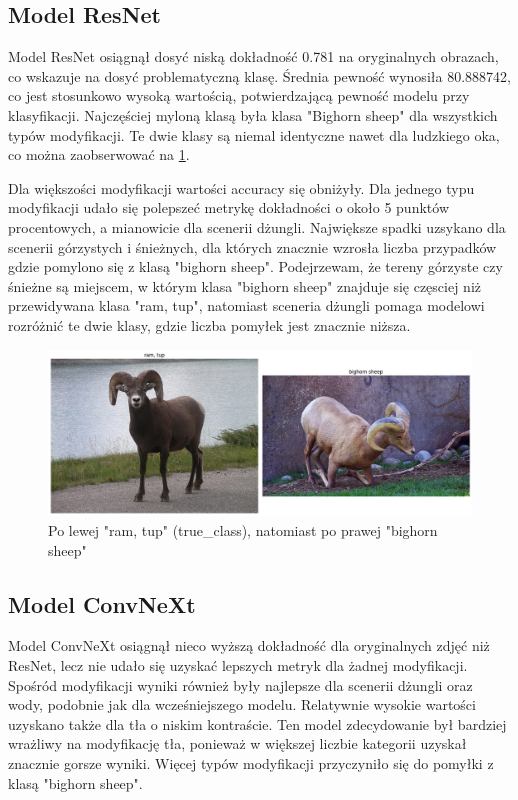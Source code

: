 \subsection*{Model ResNet}

Model ResNet osiągnął dosyć niską dokładność 0.781 na oryginalnych obrazach, co wskazuje na dosyć problematyczną klasę. Średnia pewność wynosiła 80.888742, co jest stosunkowo wysoką wartością, potwierdzającą pewność modelu przy klasyfikacji. Najczęściej myloną klasą była klasa 
"Bighorn sheep" dla wszystkich typów modyfikacji. Te dwie klasy są niemal identyczne nawet dla ludzkiego oka, co można zaobserwować na \ref*{rys:348}.

Dla większości modyfikacji wartości accuracy się obniżyły. Dla jednego typu modyfikacji udało się polepszeć metrykę dokładności o około 5 punktów procentowych, a mianowicie dla scenerii dżungli. Największe spadki uzsykano dla scenerii górzystych i śnieżnych, dla których znacznie wzrosła
liczba przypadków gdzie pomylono się z klasą "bighorn sheep". Podejrzewam, że tereny górzyste czy śnieżne są miejscem, w którym klasa "bighorn sheep" znajduje się częsciej niż przewidywana klasa "ram, tup", natomiast sceneria dżungli pomaga modelowi rozróżnić te dwie klasy, gdzie
liczba pomyłek jest znacznie niższa.


\begin{figure}
	\centering\includegraphics[width=.9\textwidth]{img/348}
	\caption{Po lewej "ram, tup" (true\_class), natomiast po prawej "bighorn sheep"}
	\label{rys:348}
\end{figure}

\subsection*{Model ConvNeXt}

Model ConvNeXt osiągnął nieco wyższą dokładność dla oryginalnych zdjęć niż ResNet, lecz nie udało się uzyskać lepszych metryk dla żadnej modyfikacji. Spośród modyfikacji wyniki również były najlepsze dla scenerii dżungli oraz wody, podobnie jak dla wcześniejszego modelu. Relatywnie 
wysokie wartości uzyskano także dla tła o niskim kontraście. Ten model zdecydowanie był bardziej wrażliwy na modyfikację tła, ponieważ w większej liczbie kategorii uzyskał znacznie gorsze wyniki. Więcej typów modyfikacji przyczyniło się do pomyłki z klasą "bighorn sheep". 

